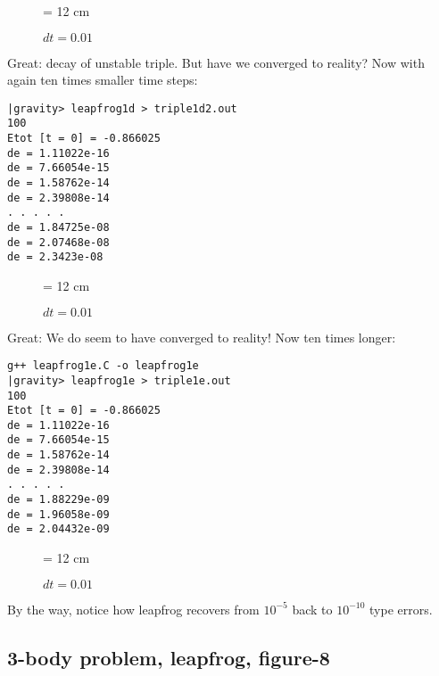 \documentclass{book}
\def\code#1{{\small}}
\begin{document}
\begin{figure}
\begin{center}
\leavevmode
\epsfxsize = 12 cm
\caption{$dt = 0.01$}
\label{fig:triple1d1}
\end{center}
\end{figure}

Great: decay of unstable triple.  But have we converged to reality?
Now with again ten times smaller time steps:

\begin{small}
\begin{verbatim}
|gravity> leapfrog1d > triple1d2.out
100
Etot [t = 0] = -0.866025
de = 1.11022e-16
de = 7.66054e-15
de = 1.58762e-14
de = 2.39808e-14
. . . . .
de = 1.84725e-08
de = 2.07468e-08
de = 2.3423e-08
\end{verbatim}
\end{small}

\begin{figure}
\begin{center}
\leavevmode
\epsfxsize = 12 cm
\caption{$dt = 0.01$}
\label{fig:triple1d2}
\end{center}
\end{figure}

Great: We do seem to have converged to reality!
Now ten times longer:

\code{leapfrog1e.C}

\begin{small}
\begin{verbatim}
g++ leapfrog1e.C -o leapfrog1e
|gravity> leapfrog1e > triple1e.out
100
Etot [t = 0] = -0.866025
de = 1.11022e-16
de = 7.66054e-15
de = 1.58762e-14
de = 2.39808e-14
. . . . .
de = 1.88229e-09
de = 1.96058e-09
de = 2.04432e-09
\end{verbatim}
\end{small}

\begin{figure}
\begin{center}
\leavevmode
\epsfxsize = 12 cm
\caption{$dt = 0.01$}
\label{fig:triple1e}
\end{center}
\end{figure}

By the way, notice how leapfrog recovers from $10^{-5}$ back to
$10^{-10}$ type errors.

\subsection{3-body problem, leapfrog, figure-8}
\end{document}
